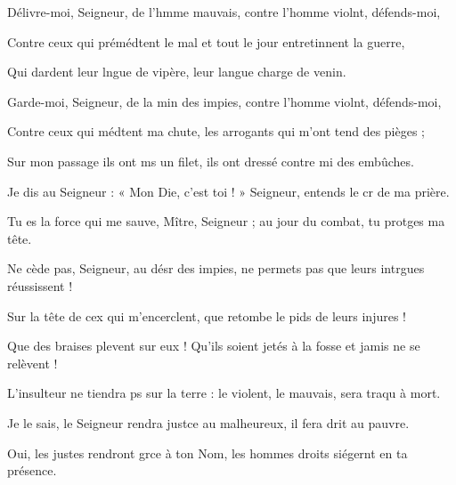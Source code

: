 \item Délivre-moi, Seigneur, de l’hmme mauvais, contre l’homme violnt, défends-moi,
\item Contre ceux qui prémédtent le mal et tout le jour entretinnent la guerre,
\item Qui dardent leur lngue de vipère, leur langue charge de venin.
\item Garde-moi, Seigneur, de la min des impies, contre l’homme violnt, défends-moi, 
\item Contre ceux qui médtent ma chute, les arrogants qui m’ont tend des pièges ; 
\item Sur mon passage ils ont ms un filet, ils ont dressé contre mi des embûches.
\item Je dis au Seigneur : « Mon Die, c’est toi ! » Seigneur, entends le cr de ma prière.
\item Tu es la force qui me sauve, Mître, Seigneur ; au jour du combat, tu protges ma tête.
\item Ne cède pas, Seigneur, au désr des impies, ne permets pas que leurs intrgues réussissent !
\item Sur la tête de cex qui m’encerclent, que retombe le pids de leurs injures !
\item Que des braises plevent sur eux ! Qu’ils soient jetés à la fosse et jamis ne se relèvent !
\item L’insulteur ne tiendra ps sur la terre : le violent, le mauvais, sera traqu à mort.
\item Je le sais, le Seigneur rendra justce au malheureux, il fera drit au pauvre.
\item Oui, les justes rendront grce à ton Nom, les hommes droits siégernt en ta présence.